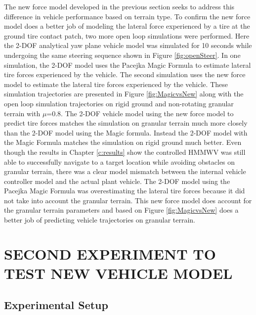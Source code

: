 \documentclass[12pt,onecolumn]{report}
\newcommand{\CHRONO}{{\sffamily{{Chrono}}}}
\begin{document}
The new force model developed in the previous section seeks to address this difference in vehicle performance based on terrain type. To confirm the new force model does a better job of modeling the lateral force experienced by a tire at the ground tire contact patch, two more open loop simulations were performed. Here the 2-DOF analytical yaw plane vehicle model was simulated for 10 seconds while undergoing the same steering sequence shown in Figure \ref{fig:openSteer}. In one simulation, the 2-DOF model uses the Pacejka Magic Formula to estimate lateral tire forces experienced by the vehicle. The second simulation uses the new force model to estimate the lateral tire forces experienced by the vehicle. These simulation trajectories are presented in Figure \ref{fig:MagicvsNew} along with the {\CHRONO} open loop simulation trajectories on rigid ground and non-rotating granular terrain with $\mu$=0.8. The 2-DOF vehicle model using the new force model to predict tire forces matches the {\CHRONO} simulation on granular terrain much more closely than the 2-DOF model using the Magic formula. Instead the 2-DOF model with the Magic Formula matches the {\CHRONO} simulation on rigid ground much better. Even though the results in Chapter \ref{c:results} show the controlled HMMWV was still able to successfully navigate to a target location while avoiding obstacles on granular terrain, there was a clear model mismatch between the internal vehicle controller model and the actual plant vehicle. The 2-DOF model using the Pacejka Magic Formula was overestimating the lateral tire forces because it did not take into account the granular terrain. This new force model does account for the granular terrain parameters and based on Figure \ref{fig:MagicvsNew} does a better job of predicting vehicle trajectories on granular terrain. 


\chapter{SECOND EXPERIMENT TO TEST NEW VEHICLE MODEL}\label{c:Exp2}

\section{Experimental Setup}\label{s:ExpSetup2}
\end{document}
